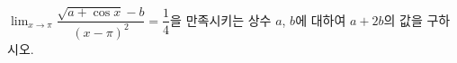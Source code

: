 $\displaystyle\lim_{x\to\pi}\dfrac{\sqrt{a+\cos x}-b}{(x-\pi)^2}=\dfrac{1}{4}$을 만족시키는 상수 $a$, $b$에 대하여 $a+2b$의 값을 구하시오.

